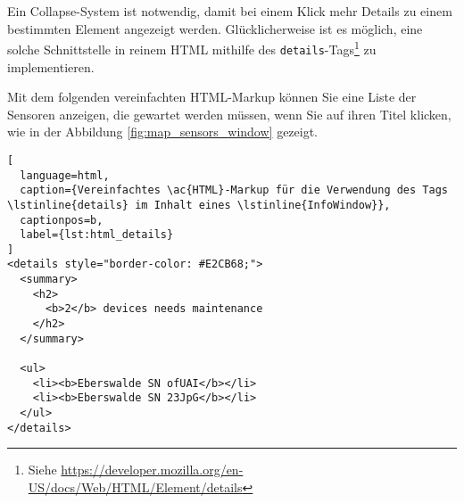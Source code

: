 Ein Collapse-System ist notwendig, damit bei einem Klick mehr Details zu einem bestimmten Element angezeigt werden.
Glücklicherweise ist es möglich, eine solche Schnittstelle in reinem \ac{HTML} mithilfe des \lstinline{details}-Tags\footnote{Siehe \href{https://developer.mozilla.org/en-US/docs/Web/HTML/Element/details}{https://developer.mozilla.org/en-US/docs/Web/HTML/Element/details}} zu implementieren.

Mit dem folgenden vereinfachten HTML-Markup können Sie eine Liste der Sensoren anzeigen, die gewartet werden müssen, wenn Sie auf ihren Titel klicken, wie in der Abbildung \ref{fig:map_sensors_window} gezeigt.

\begin{lstlisting}[
  language=html,
  caption={Vereinfachtes \ac{HTML}-Markup für die Verwendung des Tags \lstinline{details} im Inhalt eines \lstinline{InfoWindow}},
  captionpos=b,
  label={lst:html_details}
]
<details style="border-color: #E2CB68;">
  <summary>
    <h2>
      <b>2</b> devices needs maintenance
    </h2>
  </summary>

  <ul>
    <li><b>Eberswalde SN ofUAI</b></li>
    <li><b>Eberswalde SN 23JpG</b></li>
  </ul>
</details>
\end{lstlisting}


